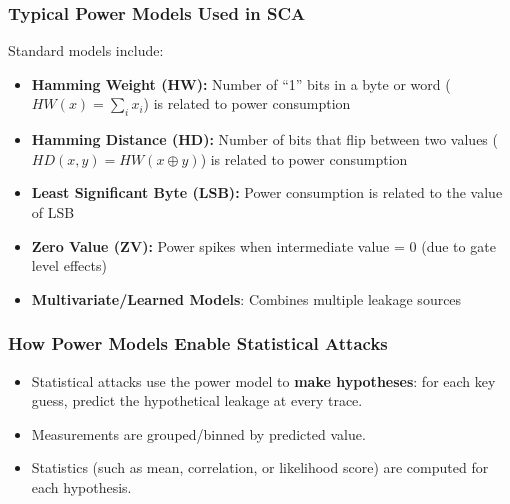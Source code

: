 \begin{frame}
    \frametitle{Typical Power Models Used in SCA}

    Standard models include:

    \begin{itemize}
        \item \textbf{Hamming Weight (HW):} Number of “1” bits in a byte or word ($HW(x) = \sum_i x_i$) is related to power consumption
        \item \textbf{Hamming Distance (HD):} Number of bits that flip between two values ($HD(x, y) = HW(x \oplus y)$) is related to power consumption
        \item \textbf{Least Significant Byte (LSB):} Power consumption is related to the value of LSB
        \item \textbf{Zero Value (ZV):} Power spikes when intermediate value = 0 (due to gate level effects)
        \item \textbf{Multivariate/Learned Models}: Combines multiple leakage sources
    \end{itemize}
\end{frame}

\begin{frame}
    \frametitle{How Power Models Enable Statistical Attacks}

    \begin{itemize}
        \item Statistical attacks use the power model to \textbf{make hypotheses}: for each key guess, predict the hypothetical leakage at every trace.
        \item Measurements are grouped/binned by predicted value.
        \item Statistics (such as mean, correlation, or likelihood score) are computed for each hypothesis.
    \end{itemize}
\end{frame}
